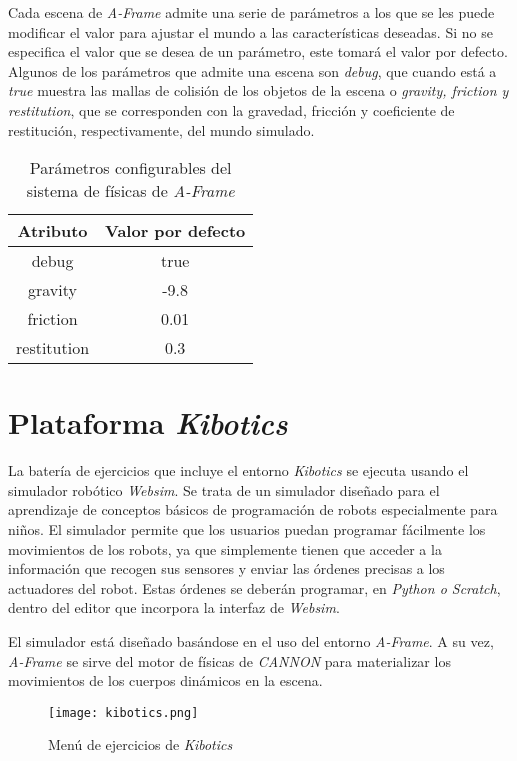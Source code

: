 Cada escena de  \textit{A-Frame}  admite una serie de parámetros a los que se les puede modificar el valor para ajustar el mundo a las características deseadas. Si no se especifica el valor que se desea de un parámetro, este tomará el valor por defecto. Algunos de los parámetros que admite una escena son \textit{debug}, que cuando está a \textit{true} muestra las mallas de colisión de los objetos de la escena o \textit{gravity, friction y restitution}, que se corresponden con la gravedad, fricción y coeficiente de restitución, respectivamente, del mundo simulado.
\begin{table}[h!]
\centering
\begin{tabular}{|c|c|}
\hline
\textbf{Atributo}    & \textbf{Valor por defecto} \\ \hline
debug       & true              \\ \hline
gravity     & -9.8              \\ \hline
friction    & 0.01              \\ \hline
restitution & 0.3               \\ \hline
\end{tabular}
\caption{Parámetros configurables del sistema de físicas de \textit{A-Frame}}
\label{fig:param-fisicas}
\end{table}

\section{Plataforma \textit{Kibotics}}
La batería de ejercicios que incluye el entorno \textit{Kibotics} se ejecuta usando el simulador robótico \textit{Websim}. Se trata de un simulador diseñado para el aprendizaje de conceptos básicos de programación de robots especialmente para niños. El simulador permite que los usuarios puedan programar fácilmente los movimientos de los robots, ya que simplemente tienen que acceder a la información que recogen sus sensores y enviar las órdenes precisas a los actuadores del robot. Estas órdenes se deberán programar, en\textit{ Python o Scratch}, dentro del editor que incorpora la interfaz de \textit{Websim}. \newline

El simulador está diseñado basándose en el uso del entorno \textit{A-Frame}. A su vez, \textit{A-Frame} se sirve del motor de físicas de \textit{CANNON} para materializar los movimientos de los cuerpos dinámicos en la escena.

\begin{figure}[h!]
    \centering
    \texttt{[image: kibotics.png]} 
    \caption{Menú de ejercicios de \textit{Kibotics}}
    \label{fig:kibotics}
\end{figure}

